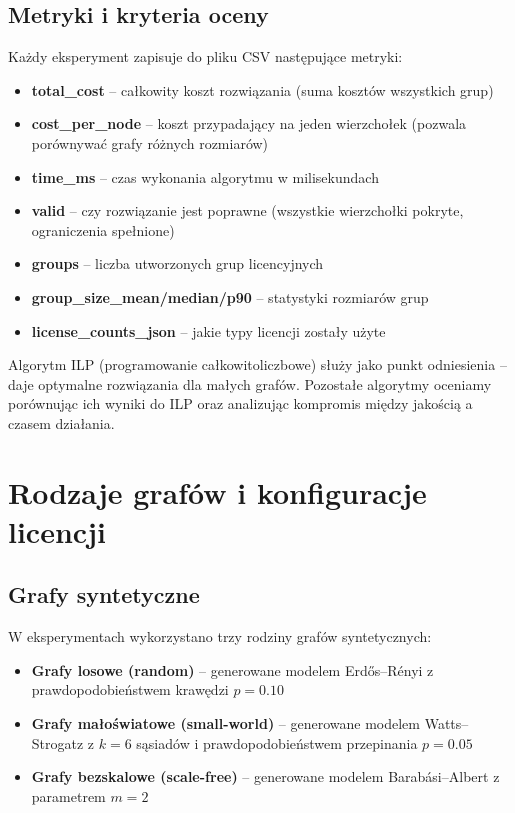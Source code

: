 \subsection{Metryki i kryteria oceny}

Każdy eksperyment zapisuje do pliku CSV następujące metryki:

\begin{itemize}
    \item \textbf{total\_cost} -- całkowity koszt rozwiązania (suma kosztów wszystkich grup)
    \item \textbf{cost\_per\_node} -- koszt przypadający na jeden wierzchołek (pozwala porównywać grafy różnych rozmiarów)
    \item \textbf{time\_ms} -- czas wykonania algorytmu w milisekundach
    \item \textbf{valid} -- czy rozwiązanie jest poprawne (wszystkie wierzchołki pokryte, ograniczenia spełnione)
    \item \textbf{groups} -- liczba utworzonych grup licencyjnych
    \item \textbf{group\_size\_mean/median/p90} -- statystyki rozmiarów grup
    \item \textbf{license\_counts\_json} -- jakie typy licencji zostały użyte
\end{itemize}

Algorytm ILP (programowanie całkowitoliczbowe) służy jako punkt odniesienia -- daje optymalne rozwiązania dla małych grafów. Pozostałe algorytmy oceniamy porównując ich wyniki do ILP oraz analizując kompromis między jakością a czasem działania.

\section{Rodzaje grafów i konfiguracje licencji}

\subsection{Grafy syntetyczne}

W eksperymentach wykorzystano trzy rodziny grafów syntetycznych:

\begin{itemize}
  \item \textbf{Grafy losowe (random)} -- generowane modelem Erdős–Rényi z prawdopodobieństwem krawędzi $p = 0.10$
  \item \textbf{Grafy małoświatowe (small-world)} -- generowane modelem Watts–Strogatz z $k = 6$ sąsiadów i prawdopodobieństwem przepinania $p = 0.05$
  \item \textbf{Grafy bezskalowe (scale-free)} -- generowane modelem Barabási–Albert z parametrem $m = 2$
\end{itemize}


